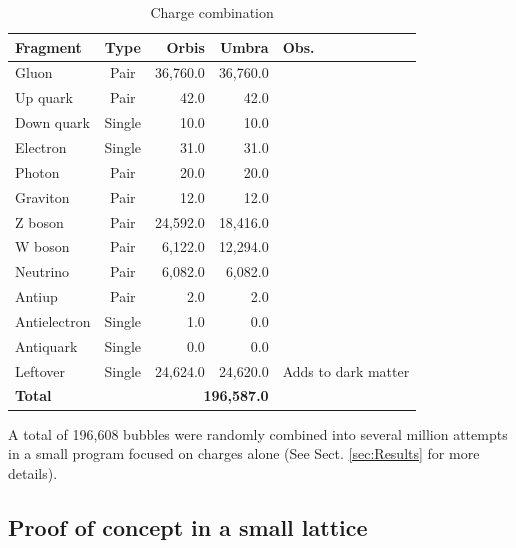 \documentclass{ijuc}
\begin{document}
\begin{table}
\caption{Charge combination}

\medskip{}
\label{combina}
\begin{centering}
{\small{}}%
\begin{tabular}{|l|c|r|r|l|}
\hline 
\textbf{\small{}Fragment} & \textbf{\small{}Type} & \textbf{\small{}Orbis} & \textbf{Umbra} & \textbf{\small{}Obs.}\tabularnewline
\hline 
\hline 
{\small{}Gluon} & {\small{}Pair} & {\small{}36,760.0} & {\small{}36,760.0} & \tabularnewline
\hline 
{\small{}Up quark} & {\small{}Pair} & {\small{}42.0} & {\small{}42.0} & \tabularnewline
\hline 
{\small{}Down quark} & {\small{}Single} & {\small{}10.0} & {\small{}10.0} & \tabularnewline
\hline 
{\small{}Electron} & {\small{}Single} & {\small{}31.0} & {\small{}31.0} & \tabularnewline
\hline 
{\small{}Photon} & {\small{}Pair} & {\small{}20.0} & {\small{}20.0} & \tabularnewline
\hline 
{\small{}Graviton} & {\small{}Pair} & {\small{}12.0} & {\small{}12.0} & \tabularnewline
\hline 
{\small{}Z boson} & {\small{}Pair} & {\small{}24,592.0} & {\small{}18,416.0} & \tabularnewline
\hline 
{\small{}W boson} & {\small{}Pair} & {\small{}6,122.0} & {\small{}12,294.0} & \tabularnewline
\hline 
{\small{}Neutrino} & {\small{}Pair} & {\small{}6,082.0} & {\small{}6,082.0} & \tabularnewline
\hline 
{\small{}Antiup} & {\small{}Pair} & {\small{}2.0} & {\small{}2.0} & \tabularnewline
\hline 
{\small{}Antielectron} & {\small{}Single} & {\small{}1.0} & {\small{}0.0} & \tabularnewline
\hline 
{\small{}Antiquark} & {\small{}Single} & {\small{}0.0} & {\small{}0.0} & \tabularnewline
\hline 
{\small{}Leftover} & {\small{}Single} & {\small{}24,624.0} & {\small{}24,620.0} & {\small{}Adds to dark matter}\tabularnewline
\hline 
\textbf{\small{}Total} &  & \multicolumn{2}{r|}{\textbf{\small{}196,587.0 }} & \tabularnewline
\hline 
\end{tabular}{\small\par}
\par\end{centering}
\medskip{}

{\small{}A total of 196,608 bubbles were randomly combined into several million attempts in a small program focused on charges alone (See Sect. \ref{sec:Results} for more details).}{\small\par}
\end{table}

\subsection{Proof of concept in a small lattice}\label{subsec:proof-of-concept}
\end{document}
